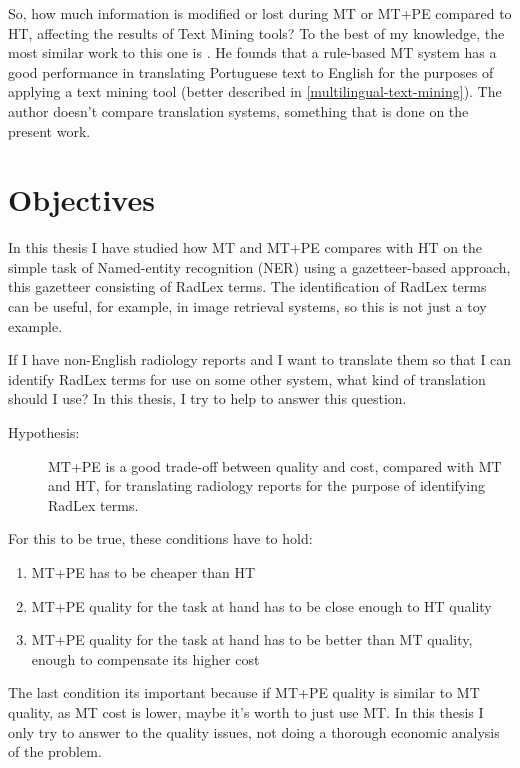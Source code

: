 So, how much information is modified or lost during MT or MT+PE compared to HT, affecting the results of Text Mining tools? To the best of my knowledge, the most similar work to this one is \citep{Castilla2007a}. He founds that a rule-based MT system has a good performance in translating Portuguese text to English for the purposes of applying a text mining tool (better described in \ref{multilingual-text-mining}). The author doesn't compare translation systems, something that is done on the present work.

\section{Objectives}

In this thesis I have studied how MT and MT+PE compares with HT on the simple task of Named-entity recognition (NER) using a gazetteer-based approach, this gazetteer consisting of RadLex terms. The identification of RadLex terms can be useful, for example, in image retrieval \citep{Gerstmair2012} systems, so this is not just a toy example. 

If I have non-English radiology reports and I want to translate them so that I can identify RadLex terms for use on some other system, what kind of translation should I use? In this thesis, I try to help to answer this question. 

\newcommand{\hypothesis}{
\begin{description}
	\item[Hypothesis:] MT+PE is a good trade-off between quality and cost, compared with MT and HT, for translating radiology reports for the purpose of identifying RadLex terms. 
\end{description}
}
\hypothesis

For this to be true, these conditions have to hold:

\begin{enumerate}
	\item MT+PE has to be cheaper than HT
	\item MT+PE quality for the task at hand has to be close enough to HT quality
	\item MT+PE quality for the task at hand has to be better than MT quality, enough to compensate its higher cost
\end{enumerate}

The last condition its important because if MT+PE quality is similar to MT quality, as MT cost is lower, maybe it's worth to just use MT. In this thesis I only try to answer to the quality issues, not doing a thorough economic analysis of the problem. 

